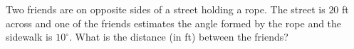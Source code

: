 Two friends are on opposite sides of a street holding a rope. The street is $20$ ft across and one of the friends estimates the angle formed by the rope and the sidewalk is $10^{\circ}$. What is the distance (in ft) between the friends?
